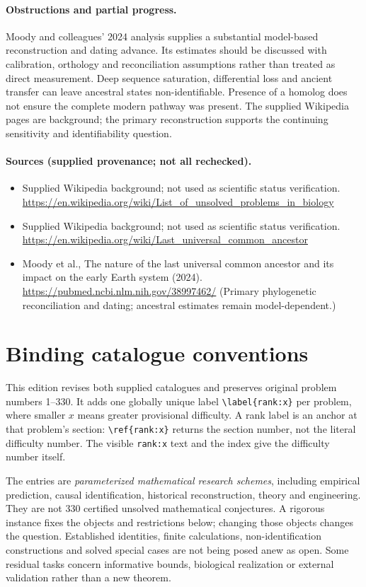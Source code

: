 \documentclass[11pt]{article}
\begin{document}
\paragraph{Obstructions and partial progress.} Moody and colleagues' 2024 analysis supplies a substantial model-based reconstruction and dating advance. Its estimates should be discussed with calibration, orthology and reconciliation assumptions rather than treated as direct measurement. Deep sequence saturation, differential loss and ancient transfer can leave ancestral states non-identifiable. Presence of a homolog does not ensure the complete modern pathway was present. The supplied Wikipedia pages are background; the primary reconstruction supports the continuing sensitivity and identifiability question.

\paragraph{Sources (supplied provenance; not all rechecked).} \begin{itemize}
\item Supplied Wikipedia background; not used as scientific status verification. \url{https://en.wikipedia.org/wiki/List_of_unsolved_problems_in_biology}
\item Supplied Wikipedia background; not used as scientific status verification. \url{https://en.wikipedia.org/wiki/Last_universal_common_ancestor}
\item Moody et al., The nature of the last universal common ancestor and its impact on the early Earth system (2024). \url{https://pubmed.ncbi.nlm.nih.gov/38997462/} (Primary phylogenetic reconciliation and dating; ancestral estimates remain model-dependent.)
\end{itemize}


\section*{Binding catalogue conventions}
This edition revises both supplied catalogues and preserves original problem numbers 1--330. It adds one globally unique label \verb|\label{rank:x}| per problem, where smaller $x$ means greater provisional difficulty. A rank label is an anchor at that problem's section: \verb|\ref{rank:x}| returns the section number, not the literal difficulty number. The visible \texttt{rank:x} text and the index give the difficulty number itself.

The entries are \emph{parameterized mathematical research schemes}, including empirical prediction, causal identification, historical reconstruction, theory and engineering. They are not 330 certified unsolved mathematical conjectures. A rigorous instance fixes the objects and restrictions below; changing those objects changes the question. Established identities, finite calculations, non-identification constructions and solved special cases are not being posed anew as open. Some residual tasks concern informative bounds, biological realization or external validation rather than a new theorem.
\end{document}
